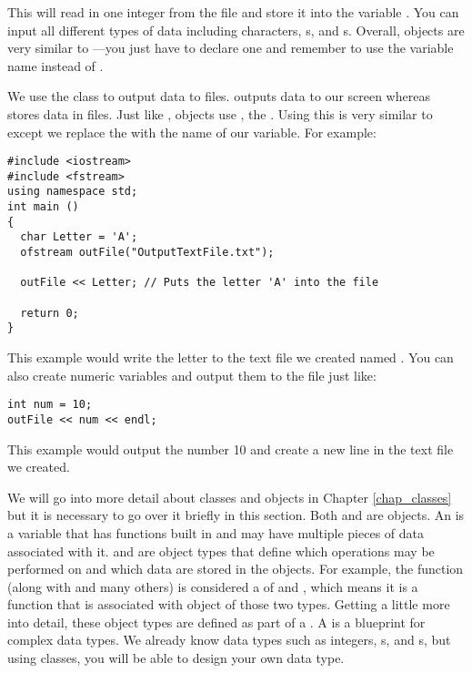 This will read in one integer from the file and store it into the variable . 
You can input all different types of data including characters, s, and s. 
Overall,  objects are very similar to ---you just have to declare one and remember to use the variable name instead of .


We use the  class to output data to files. 
 outputs data to our screen whereas  stores data in files. 
Just like ,  objects use \Code{<<}, the . 
Using this is very similar to  except we replace the  with the name of our variable. 
For example: \nopagebreak[4]

\noindent\begin{minipage}{\linewidth}\begin{lstlisting}		
#include <iostream> 
#include <fstream>
using namespace std;
int main ()
{
  char Letter = 'A';
  ofstream outFile("OutputTextFile.txt");

  outFile << Letter; // Puts the letter 'A' into the file

  return 0;
}
\end{lstlisting}\end{minipage}

This example would write the letter  to the text file we created named . 
You can also create numeric variables and output them to the file just like:
			
\noindent\begin{minipage}{\linewidth}\begin{lstlisting}
int num = 10;
outFile << num << endl;
\end{lstlisting}\end{minipage}		

This example would output the number 10 and create a new line in the text file we created. 

	
We will go into more detail about classes and objects in Chapter \ref{chap_classes} but it is necessary to go over it briefly in this section. 
Both  and  are objects. 
An  is a variable that has functions built in and may have multiple pieces of data associated with it. 
 and  are object types that define which operations may be performed on and which data are stored in the objects. 
For example, the function  (along with  and many others) is considered a  of  and , which means it is a function that is associated with object of those two types. 
Getting a little more into detail, these object types are defined as part of a . 
A  is a blueprint for complex data types. 
We already know data types such as integers, s, and s, but using classes, you will be able to design your own data type.

